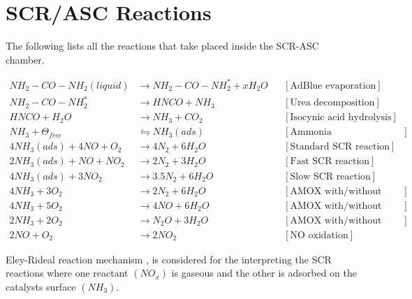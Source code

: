 \newpage
\section{SCR/ASC Reactions}
The following lists all the reactions that take placed inside the SCR-ASC chamber.

\begin{align*}
    NH_2 - CO - NH_2 (liquid) &\longrightarrow NH_2 - CO - NH_2^* + x H_2 O
                & &[\text{AdBlue evaporation}] \\
    NH_2 - CO - NH_2^*  &\longrightarrow  HNCO + NH_3
                & &[\text{Urea decomposition}] \\
    HNCO + H_2O &\longrightarrow NH_3 + CO_2
                & &[\text{Isocynic acid hydrolysis}] \\
    NH_3 + \Theta_{free} &\leftrightharpoons NH_3(ads)
                         & &[\text{Ammonia Adsorption/Desorption}]\\
    4 NH_3 (ads) + 4 NO + O_2 &\longrightarrow 4 N_2 + 6 H_2O
                              & &[\text{Standard SCR reaction}]\\
    2 NH_3 (ads) +  NO + N O_2 &\longrightarrow 2 N_2 + 3 H_2O
                              & &[\text{Fast SCR reaction}]\\
    4 NH_3 (ads) + 3N O_2 &\longrightarrow 3.5 N_2 + 6 H_2O
                              & &[\text{Slow SCR reaction}]\\
    4 NH_3 + 3 O_2 &\longrightarrow 2 N_2 + 6 H_2O
                         & &[\text{AMOX with/without ASC}]\\
    4 NH_3 + 5 O_2 &\longrightarrow 4 NO + 6 H_2 O
                         & &[\text{AMOX with/without ASC}]\\
    2 NH_3 + 2 O_2 &\longrightarrow N_2O + 3 H_2O
                         & &[\text{AMOX with/without ASC}]\\
    2 NO + O_2 &\longrightarrow 2 NO_2
                        & &[\text{NO oxidation}]
\end{align*}

Eley-Rideal reaction mechanism \cite{hsieh2011development}
\cite{yuan2015diesel}, \cite{nova2014urea} is considered for the interpreting
the SCR reactions where one reactant $(NO_x)$ is gaseous and the other is
adsorbed on the catalysts surface $(NH_3)$.

